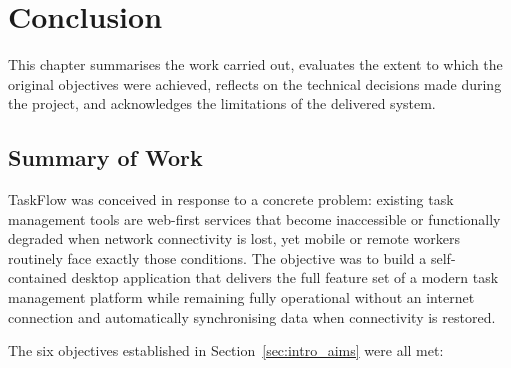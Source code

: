 ﻿\chapter{Conclusion}\label{chap:concl}

This chapter summarises the work carried out, evaluates the extent to which the
original objectives were achieved, reflects on the technical decisions made during
the project, and acknowledges the limitations of the delivered system.

\section{Summary of Work}\label{sec:concl_summary}

TaskFlow was conceived in response to a concrete problem: existing task management
tools are web-first services that become inaccessible or functionally degraded when
network connectivity is lost, yet mobile or remote workers routinely face exactly those
conditions.
The objective was to build a self-contained desktop application that delivers the full
feature set of a modern task management platform while remaining fully operational
without an internet connection and automatically synchronising data when connectivity
is restored.

The six objectives established in Section~\ref{sec:intro_aims} were all met:

